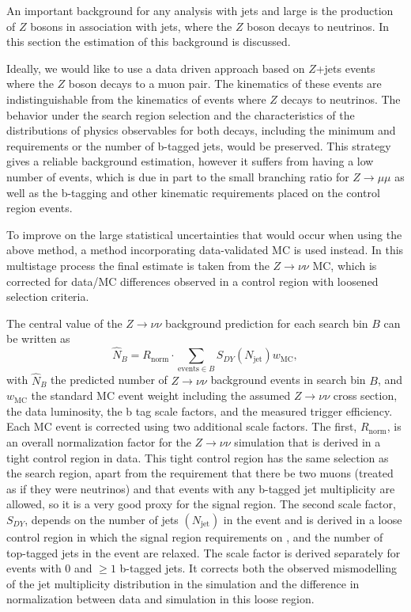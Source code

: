 An important background for any analysis with jets and large \MET is
the production of $Z$ bosons in association with jets, where the $Z$
boson decays to neutrinos.  In this section the estimation of this background
is discussed.  

Ideally, we would like to use a data driven approach based on
$Z$+jets events where the $Z$ boson decays to a
muon pair. The kinematics of these events are indistinguishable from the
kinematics of events where $Z$ decays to neutrinos.
The behavior under the search region selection and the characteristics
of the distributions of physics observables for both decays, including the minimum
\HT and \MET requirements or the number of b-tagged jets, would be
preserved.
This strategy gives a reliable background estimation, however it suffers from
having a low number of events, which is due in part to the small branching ratio for $Z \rightarrow \mu \mu$
as well as the b-tagging and other kinematic requirements placed on the control
region events.

To improve on the large statistical uncertainties that would occur when using the
above method, a method incorporating data-validated MC is used instead.
In this multistage process the final estimate is taken from the
$Z \rightarrow \nu \nu$ MC, which is corrected for
data/MC differences observed in a control region with loosened selection criteria.

The central value of the $Z \rightarrow \nu \nu$ background prediction
for each search bin $B$ can be written as
\begin{equation}
\widehat{N}_B = R_\textrm{norm} \cdot \sum_{\textrm{events}\in B} S_{DY}(N_\textrm{jet}) w_\textrm{MC},
\label{eq:zinv_pred}
\end{equation}
with $\widehat{N}_B$ the predicted number of $Z \rightarrow \nu \nu$
background events in search bin $B$, and $w_\textrm{MC}$ the standard MC event
weight including the assumed $Z \rightarrow \nu \nu$ cross section, the data
luminosity, the b tag scale factors,
and the measured trigger efficiency.
Each MC event is corrected using two additional scale factors. The first, $R_\textrm{norm}$,
is an overall normalization factor for the $Z \rightarrow \nu \nu$ simulation
that is derived in a tight control region in data.
This tight control region has the same selection as the search region, apart from
the requirement that there be two muons (treated as if they were neutrinos) and
that events with any b-tagged jet multiplicity are allowed, so it is a very
good proxy for the signal region.
The second scale factor, $S_{DY}$, depends on the number of jets $(N_\textrm{jet})$
in the event and is derived in a loose control region in which the signal region
requirements on \MET, \MTTwo and the number of top-tagged jets in the event are
relaxed.
The scale factor is derived separately for events with 0 and ${\geq}1$ b-tagged
jets. 
It corrects both the observed mismodelling of the jet multiplicity distribution
in the simulation and the difference in normalization between data and simulation
in this loose region.

